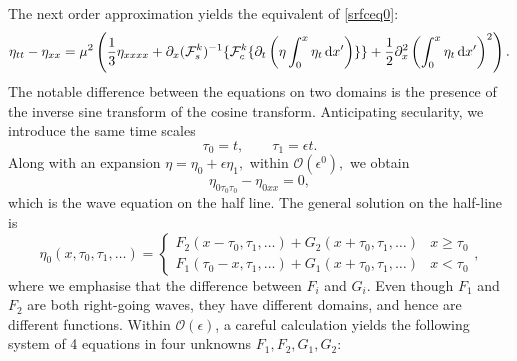 The next order approximation yields the equivalent of \eqref{srfceq0}:
\begin{equation}\label{S5:SurfaceElevationHL}
 \eta_{tt} - \eta_{xx} = \mu^2 \left( \frac{1}{3} \eta_{xxxx}  + \partial_x(\mathcal{F}^k_s)^{-1} \{ \mathcal{F}^k_c \{ \partial_t \left( \eta \int^{x}_0\eta_{t} \,\mathrm{d} x' \right)\} \} + \frac{1}{2} \partial^2_x\left(\int^{x}_0\eta_{t} \,\mathrm{d} x' \right)^2\right).
\end{equation}
The notable difference between the equations on two domains is the presence of the inverse sine transform of the cosine transform. Anticipating secularity, we introduce the same time scales 
\[ \tau_0 = t, \qquad \tau_1 = \epsilon t.\]
Along with an expansion $\eta = \eta_0 + \epsilon \eta_1,$ within $\mathcal{O}(\epsilon^0),$ we obtain
\[ \eta_{0\tau_0 \tau_0} - \eta_{0xx} = 0,\]
which is the wave equation on the half line. The general solution on the half-line is 
\[ \eta_0(x, \tau_0, \tau_1, \ldots ) = \begin{cases} F_2(x-\tau_0, \tau_1, \ldots ) + G_2(x+\tau_0, \tau_1, \ldots) & x\geq \tau_0 \\ F_1(\tau_0-x, \tau_1, \ldots ) + G_1(x+\tau_0, \tau_1, \ldots) & x<\tau_0 \end{cases}, \]
where we emphasise that the difference between $F_i$ and $G_i.$ Even though $F_1$ and $F_2$ are both right-going waves, they have different domains, and hence are different functions. Within $\mathcal{O}(\epsilon)$, a careful calculation yields the following system of 4 equations in four unknowns $F_1, F_2, G_1, G_2:$
